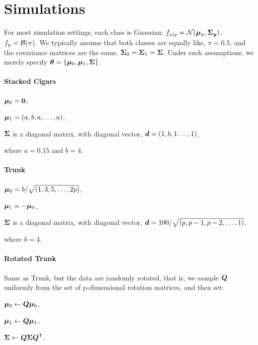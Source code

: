 \documentclass[10pt]{article}
\begin{document}
\clearpage
\appendix

\section{Simulations}


For most simulation settings, each class is Guassian:
$f_{x|y} = \mathcal{N}(\boldsymbol{\mu}_y,\boldsymbol{\Sigma_y})$,
$f_y = \mathcal{B}(\pi)$.
We typically assume that both classes are equally like, $\pi=0.5$, and the covariance matrices are the same, $\boldsymbol{\Sigma}_0=\boldsymbol{\Sigma}_1=\boldsymbol{\Sigma}$. Under such assumptions, we merely specify $\boldsymbol{\theta}=\{\boldsymbol{\mu}_0,\boldsymbol{\mu}_1, \boldsymbol{\Sigma}\}$.


\paragraph*{Stacked Cigars}
\begin{compactitem}
\item $\boldsymbol{\mu}_0=\boldsymbol{0}$,
\item $\boldsymbol{\mu}_1=(a, b, a, \ldots, a)$,
\item $\boldsymbol{\Sigma}$ is a diagonal matrix, with diagonal vector, $\boldsymbol{d}=(1,b,1\ldots,1)$,
\end{compactitem}
where $a=0.15$ and $b=4$.


\paragraph*{Trunk}
\begin{compactitem}
\item $\boldsymbol{\mu}_0=b/\sqrt{(1, 3, 5, \ldots, 2p)}$,
\item $\boldsymbol{\mu}_1=-\boldsymbol{\mu}_0$,
\item $\boldsymbol{\Sigma}$ is a diagonal matrix, with diagonal vector, $\boldsymbol{d}=100/\sqrt{(p, p-1, p-2, \ldots, 1)}$,
\end{compactitem}
where $b=4$.



\paragraph*{Rotated Trunk} Same as Trunk, but the data are randomly rotated, that is, we sample $\boldsymbol{Q}$ uniformly from the set of p-dimensional rotation matrices, and then set:
\begin{compactitem}
\item $\boldsymbol{\mu}_0 \leftarrow \boldsymbol{Q} \boldsymbol{\mu}_0$,
\item $\boldsymbol{\mu}_1 \leftarrow \boldsymbol{Q} \boldsymbol{\mu}_1$,
\item $\boldsymbol{\Sigma} \leftarrow \boldsymbol{Q} \boldsymbol{\Sigma} \boldsymbol{Q}^{\mathsf{T}}$.
\end{compactitem}
\end{document}
